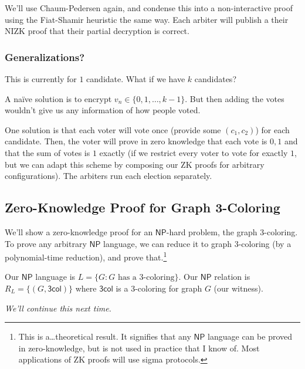We'll use Chaum-Pedersen again, and condense this into a non-interactive proof using the Fiat-Shamir heuristic the same way. Each arbiter will publish a their NIZK proof that their partial decryption is correct.

\subsubsection{Generalizations?}
This is currently for $1$ candidate. What if we have $k$ candidates?

A na\"ive solution is to encrypt $v_n\in \{0, 1, \dots, k-1\}$. But then adding the votes wouldn't give us any information of how people voted.

One solution is that each voter will vote once (provide some $(c_1, c_2)$) for each candidate. Then, the voter will prove in zero knowledge that each vote is $0, 1$ and that the sum of votes is $1$ exactly (if we restrict every voter to vote for exactly $1$, but we can adapt this scheme by composing our ZK proofs for arbitrary configurations). The arbiters run each election separately.

\subsection{Zero-Knowledge Proof for Graph 3-Coloring}
We'll show a zero-knowledge proof for an $\mathsf{NP}$-hard problem, the graph 3-coloring. To prove any arbitrary $\mathsf{NP}$ language, we can reduce it to graph 3-coloring (by a polynomial-time reduction), and prove that.\footnote{This is a\dots theoretical result. It signifies that any $\mathsf{NP}$ language can be proved in zero-knowledge, but is not used in practice that I know of. Most applications of ZK proofs will use sigma protocols.}


Our $\mathsf{NP}$ language is $L = \{G : G\text{ has a 3-coloring}\}$. Our $\mathsf{NP}$ relation is $R_L = \{(G, \mathsf{3col})\}$ where $\mathsf{3col}$ is a 3-coloring for graph $G$ (our witness).

\emph{We'll continue this next time.}